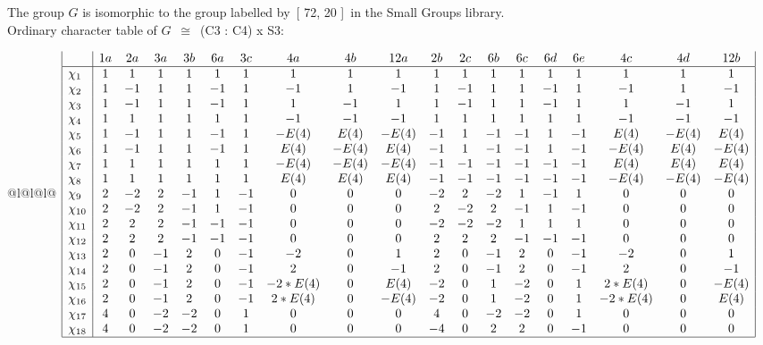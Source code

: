 \documentclass[varwidth=\maxdimen,border=10]{standalone}
\begin{document}
The group $G$ is isomorphic to the group labelled by\ [ 72, 20 ]\ in the Small Groups library.\\
Ordinary character table of $G$\ $\cong$\ (C3 : C4) x S3:\\
\begin{center}
\begin{tabular}{@{}l@{}l@{}l@{}}
\hline
\(\begin{array}{|l|cccccccccccccccccc|}
  & 1a & 2a & 3a & 3b & 6a & 3c & 4a & 4b & 12a & 2b & 2c & 6b & 6c & 6d & 6e & 4c & 4d & 12b\\ \hline
\chi_{1} & 1 & 1 & 1 & 1 & 1 & 1 & 1 & 1 & 1 & 1 & 1 & 1 & 1 & 1 & 1 & 1 & 1 & 1\\
\chi_{2} & 1 & -1 & 1 & 1 & -1 & 1 & -1 & 1 & -1 & 1 & -1 & 1 & 1 & -1 & 1 & -1 & 1 & -1\\
\chi_{3} & 1 & -1 & 1 & 1 & -1 & 1 & 1 & -1 & 1 & 1 & -1 & 1 & 1 & -1 & 1 & 1 & -1 & 1\\
\chi_{4} & 1 & 1 & 1 & 1 & 1 & 1 & -1 & -1 & -1 & 1 & 1 & 1 & 1 & 1 & 1 & -1 & -1 & -1\\
\chi_{5} & 1 & -1 & 1 & 1 & -1 & 1 & -E(4) & E(4) & -E(4) & -1 & 1 & -1 & -1 & 1 & -1 & E(4) & -E(4) & E(4)\\
\chi_{6} & 1 & -1 & 1 & 1 & -1 & 1 & E(4) & -E(4) & E(4) & -1 & 1 & -1 & -1 & 1 & -1 & -E(4) & E(4) & -E(4)\\
\chi_{7} & 1 & 1 & 1 & 1 & 1 & 1 & -E(4) & -E(4) & -E(4) & -1 & -1 & -1 & -1 & -1 & -1 & E(4) & E(4) & E(4)\\
\chi_{8} & 1 & 1 & 1 & 1 & 1 & 1 & E(4) & E(4) & E(4) & -1 & -1 & -1 & -1 & -1 & -1 & -E(4) & -E(4) & -E(4)\\
\chi_{9} & 2 & -2 & 2 & -1 & 1 & -1 & 0 & 0 & 0 & -2 & 2 & -2 & 1 & -1 & 1 & 0 & 0 & 0\\
\chi_{10} & 2 & -2 & 2 & -1 & 1 & -1 & 0 & 0 & 0 & 2 & -2 & 2 & -1 & 1 & -1 & 0 & 0 & 0\\
\chi_{11} & 2 & 2 & 2 & -1 & -1 & -1 & 0 & 0 & 0 & -2 & -2 & -2 & 1 & 1 & 1 & 0 & 0 & 0\\
\chi_{12} & 2 & 2 & 2 & -1 & -1 & -1 & 0 & 0 & 0 & 2 & 2 & 2 & -1 & -1 & -1 & 0 & 0 & 0\\
\chi_{13} & 2 & 0 & -1 & 2 & 0 & -1 & -2 & 0 & 1 & 2 & 0 & -1 & 2 & 0 & -1 & -2 & 0 & 1\\
\chi_{14} & 2 & 0 & -1 & 2 & 0 & -1 & 2 & 0 & -1 & 2 & 0 & -1 & 2 & 0 & -1 & 2 & 0 & -1\\
\chi_{15} & 2 & 0 & -1 & 2 & 0 & -1 & -2*E(4) & 0 & E(4) & -2 & 0 & 1 & -2 & 0 & 1 & 2*E(4) & 0 & -E(4)\\
\chi_{16} & 2 & 0 & -1 & 2 & 0 & -1 & 2*E(4) & 0 & -E(4) & -2 & 0 & 1 & -2 & 0 & 1 & -2*E(4) & 0 & E(4)\\
\chi_{17} & 4 & 0 & -2 & -2 & 0 & 1 & 0 & 0 & 0 & 4 & 0 & -2 & -2 & 0 & 1 & 0 & 0 & 0\\
\chi_{18} & 4 & 0 & -2 & -2 & 0 & 1 & 0 & 0 & 0 & -4 & 0 & 2 & 2 & 0 & -1 & 0 & 0 & 0\\
\hline
\end{array}\)\\
\end{tabular}
\end{center}
\end{document}
